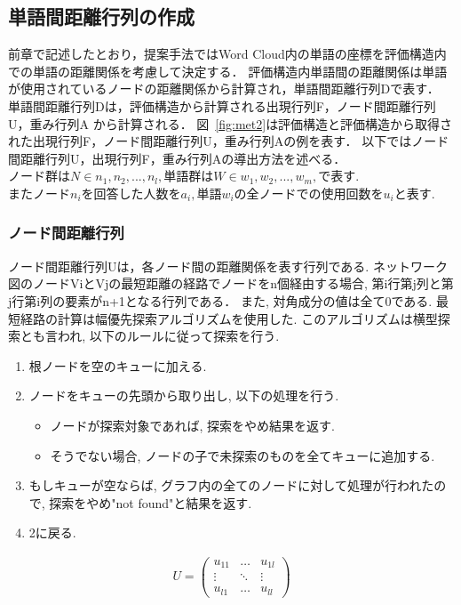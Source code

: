 \documentclass[syuuron]{kuee}
\begin{document}
		\subsection{単語間距離行列の作成}
			前章で記述したとおり，提案手法ではWord Cloud内の単語の座標を評価構造内での単語の距離関係を考慮して決定する．
			評価構造内単語間の距離関係は単語が使用されているノードの距離関係から計算され，単語間距離行列Dで表す．
			単語間距離行列Dは，評価構造から計算される出現行列F，ノード間距離行列U，重み行列A から計算される．
			図~\ref{fig:met2}は評価構造と評価構造から取得された出現行列F，ノード間距離行列U，重み行列Aの例を表す．
			以下ではノード間距離行列U，出現行列F，重み行列Aの導出方法を述べる．
			$ノード群はN \in {n_{1}, n_{2}, ..., n_{l}}, 単語群はW \in {w_{1}, w_{2}, ..., w_{m}}, で表す. $
			$またノードn_iを回答した人数をa_i, 単語w_iの全ノードでの使用回数をu_iと表す. $
			
			\subsubsection{ノード間距離行列}
				ノード間距離行列Uは，各ノード間の距離関係を表す行列である. 
				ネットワーク図のノードViとVjの最短距離の経路でノードをn個経由する場合, 
				第i行第j列と第j行第i列の要素がn+1となる行列である．
				また, 対角成分の値は全て0である. 
				最短経路の計算は幅優先探索アルゴリズムを使用した. 
				このアルゴリズムは横型探索とも言われ, 以下のルールに従って探索を行う. 
				
				\begin{enumerate}
					\item 根ノードを空のキューに加える. 
					\item ノードをキューの先頭から取り出し, 以下の処理を行う. 
						\begin{itemize}
							\item ノードが探索対象であれば, 探索をやめ結果を返す. 
							\item そうでない場合, ノードの子で未探索のものを全てキューに追加する. 
						\end{itemize}
					\item もしキューが空ならば, グラフ内の全てのノードに対して処理が行われたので, 探索をやめ"not found"と結果を返す. 
					\item 2に戻る. 
				\end{enumerate}
				
				\begin{eqnarray}
				 U = \left(
				    \begin{array}{cccc}
				    	u_{11} & \ldots & u_{1l} \\
				    	\vdots & \ddots & \vdots \\
				    	u_{l1} & \ldots & u_{ll}
					\end{array}
				 \right)
				\end{eqnarray}	
		
\end{document}
